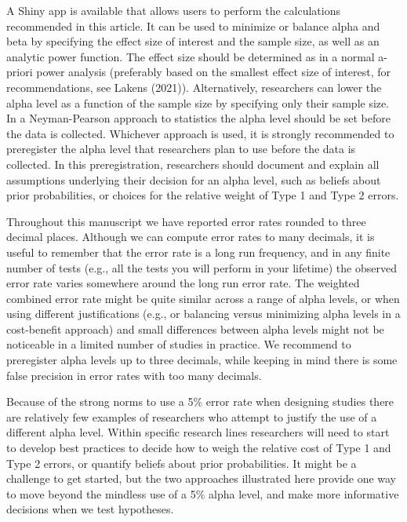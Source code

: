 \documentclass[
  english,
  ,man, a4paper,floatsintext]{apa6}
\begin{document}
A Shiny app is available that allows users to perform the calculations recommended in this article. It can be used to minimize or balance alpha and beta by specifying the effect size of interest and the sample size, as well as an analytic power function. The effect size should be determined as in a normal a-priori power analysis (preferably based on the smallest effect size of interest, for recommendations, see Lakens (2021)). Alternatively, researchers can lower the alpha level as a function of the sample size by specifying only their sample size. In a Neyman-Pearson approach to statistics the alpha level should be set before the data is collected. Whichever approach is used, it is strongly recommended to preregister the alpha level that researchers plan to use before the data is collected. In this preregistration, researchers should document and explain all assumptions underlying their decision for an alpha level, such as beliefs about prior probabilities, or choices for the relative weight of Type 1 and Type 2 errors.

Throughout this manuscript we have reported error rates rounded to three decimal places. Although we can compute error rates to many decimals, it is useful to remember that the error rate is a long run frequency, and in any finite number of tests (e.g., all the tests you will perform in your lifetime) the observed error rate varies somewhere around the long run error rate. The weighted combined error rate might be quite similar across a range of alpha levels, or when using different justifications (e.g., or balancing versus minimizing alpha levels in a cost-benefit approach) and small differences between alpha levels might not be noticeable in a limited number of studies in practice. We recommend to preregister alpha levels up to three decimals, while keeping in mind there is some false precision in error rates with too many decimals.

Because of the strong norms to use a 5\% error rate when designing studies there are relatively few examples of researchers who attempt to justify the use of a different alpha level. Within specific research lines researchers will need to start to develop best practices to decide how to weigh the relative cost of Type 1 and Type 2 errors, or quantify beliefs about prior probabilities. It might be a challenge to get started, but the two approaches illustrated here provide one way to move beyond the mindless use of a 5\% alpha level, and make more informative decisions when we test hypotheses.
\end{document}
